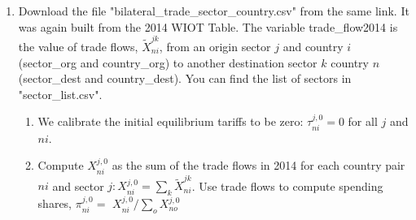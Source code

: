 \documentclass[12pt,oneside,reqno]{article}
\begin{document}
\begin{enumerate}[label=\roman*., leftmargin=*]
\begin{enumerate}
\end{enumerate}

\item Download the file "bilateral\_trade\_sector\_country.csv" from the same link. It was again built from the 2014 WIOT Table. The variable trade\_flow2014 is the value of trade flows, $\tilde{X}_{n i}^{j k}$, from an origin sector $j$ and country $i$ (sector\_org and country\_org) to another destination sector $k$ country $n$ (sector\_dest and country\_dest). You can find the list of sectors in "sector\_list.csv".
\begin{enumerate}
    \item We calibrate the initial equilibrium tariffs to be zero: $\tau_{n i}^{j, 0}=0$ for all $j$ and $n i$.

\item Compute $X_{n i}^{j, 0}$ as the sum of the trade flows in 2014 for each country pair $n i$ and sector $j: X_{n i}^{j, 0}=\sum_{k} \tilde{X}_{n i}^{j k}$. Use trade flows to compute spending shares, $\pi_{n i}^{j, 0}=$ $X_{n i}^{j, 0} / \sum_{o} X_{n o}^{j, 0}$


\end{enumerate}
\end{enumerate}
\end{document}

